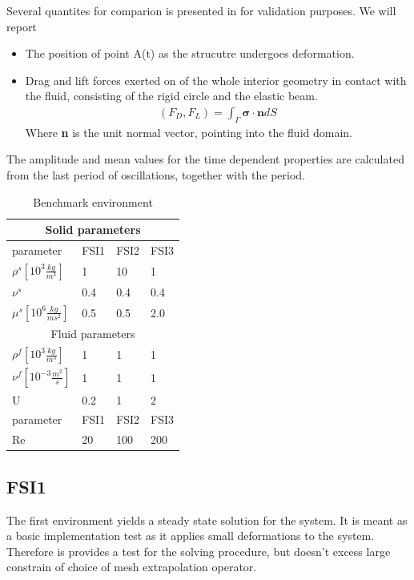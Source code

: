 Several quantites for comparion is presented in \cite{Hron2006} for validation purposes. We will report
\begin{itemize}
\item The position of point A(t) as the strucutre undergoes deformation.
\item Drag and lift forces exerted on of the whole interior geometry in contact with the fluid, consisting of the rigid circle and the elastic beam. 
\begin{align*}
(F_D, F_L) = \int_{\Gamma} \mathbf{\sigma} \cdot \mathbf{n} dS
\end{align*}
Where \textbf{n} is the unit normal vector, pointing into the fluid domain. 
\end{itemize}
The amplitude and mean values for the time dependent properties are calculated from the last period of oscillations, together with the period. 

\begin{table}[h]
\centering
\caption{Benchmark environment}
\label{my-label}
\begin{tabular}{ |p{3cm}||p{3cm}|p{3cm}|p{3cm}|  }
 \hline
 \multicolumn{4}{|c|}{Solid parameters} \\
 \hline
 parameter              & FSI1 & FSI2 & FSI3 \\
 \hline
 $\rho^s [10^{3} \frac{kg}{m^3}]$ & 1    & 10   & 1    \\
$\nu^s$ & 0.4  & 0.4  & 0.4  \\
$\mu^s  [10^{6}\frac{kg}{ms^2}]$  & 0.5  & 0.5  & 2.0  \\
 \hline
 \multicolumn{4}{|c|}{Fluid parameters} \\
 \hline
$\rho^f [10^{3}\frac{kg}{m^3}]$ & 1    & 1    & 1    \\
$\nu^f  [10^{-3}\frac{m^2}{s}]$  & 1    & 1    & 1    \\
U                      & 0.2  & 1    & 2    \\
parameter              & FSI1 & FSI2 & FSI3 \\
Re                     & 20   & 100  & 200 \\
\hline
\end{tabular}
\end{table}


\subsection{FSI1}
The first environment yields a steady state solution for the system. It is meant as a basic implementation test as it applies small deformations to the system. Therefore is provides a test for the solving procedure, but doesn't excess large constrain of choice of mesh extrapolation operator. 



